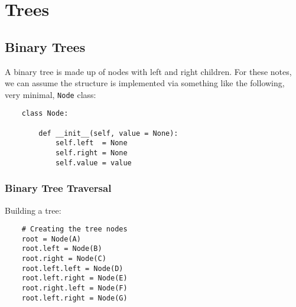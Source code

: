 \documentclass[12pt]{article}
\begin{document}
\section{Trees}
\subsection{Binary Trees}
A binary tree is made up of nodes with left and right children. For these notes, we can assume the structure is implemented via something like the following, very minimal, \verb|Node| class:

\begin{lstlisting}
	class Node:
	
		def __init__(self, value = None):
			self.left  = None
			self.right = None
			self.value = value
\end{lstlisting}

\subsubsection*{Binary Tree Traversal}
Building a tree:
\begin{lstlisting}
	# Creating the tree nodes
	root = Node(A)
	root.left = Node(B)
	root.right = Node(C)
	root.left.left = Node(D)
	root.left.right = Node(E)
	root.right.left = Node(F)
	root.left.right = Node(G)
\end{lstlisting}
\begin{center}
\end{center}
\end{document}
